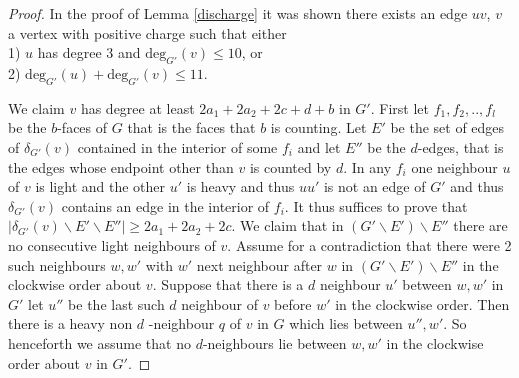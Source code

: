 \documentclass{article}
\newcommand{\0}{\mathbb{0}}
\newcommand{\1}{\mathbb{1}}
\begin{document}
\begin{proof}
 In the proof of Lemma \ref{discharge} it was shown there exists an edge $uv$, $v$  a vertex with positive charge such that either \\
 1) $u$ has degree 3 and $\text{deg}_{G'}(v) \leq 10$, or \\
 2) $\text{deg}_{G'}(u)+ \text{deg}_{G'}(v) \leq 11$.

We claim $v$ has degree at least  $2a_1 +2a_2+2c+d +b  $ in $G'$. First let $f_1, f_2,.., f_l$ be the $b$-faces of $G$ that is the faces that $b$ is counting. Let $E'$ be the set of edges of $\delta_{G'} (v)$ contained in the interior of some $f_i$ and let $E''$ be the $d$-edges, that is the edges whose endpoint other than $v$ is counted by $d$.  In any $f_i$ one neighbour $u$ of $v$ is light and the other $u'$ is heavy and thus $uu'$ is not an edge of $G'$ and thus $ \delta_{G'}(v) $ contains an edge in the interior of $f_i$. It thus suffices to prove that $ | \delta_{G'}(v) \backslash E' \backslash E'' | \geq  2a_1 +2a_2+2c$.  We claim that in $ (G' \backslash E' ) \backslash E'' $ there are no consecutive light neighbours of $v$. Assume for a contradiction that there were 2 such neighbours $w,w'$ with $w'$ next neighbour after $w$ in $ (G' \backslash E' ) \backslash E'' $ in the clockwise order about $v$. Suppose that there is a $d$ neighbour $u'$ between $w,w'$ in $G'$ let $u''$ be the last such $d$ neighbour of $ v $ before $w'$ in the clockwise order. Then there is a heavy non $d$ -neighbour $q$ of $v$ in $G$  which lies between $ u'',w' $.  So henceforth we assume that no $d$-neighbours lie between $w, w'$ in the clockwise order about $v$ in $G'$.  


\end{proof}
\end{document}
